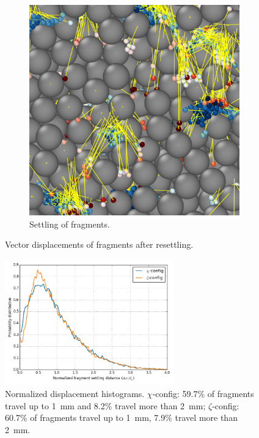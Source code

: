 \documentclass[11pt]{report} %
\begin{document}
\begin{figure}[h]
\begin{subfigure}[t]{0.45\textwidth}
                \includegraphics[width=\textwidth]{images/crushed_final}
                \caption{Settling of fragments.}
                \label{fig:crushed-final}
        \end{subfigure}
        \caption{Vector displacements of fragments after resettling.}\label{fig:crushed-travel}
\end{figure}

\begin{figure}[!t]
    \centering
    \includegraphics[width = 0.65\textwidth]{images/displacement_histograms.png}
    \caption{Normalized displacement histograms. $\chi$-config: 59.7\% of fragments travel up to \SI{1}{\milli\meter} and 8.2\% travel more than \SI{2}{\milli\meter}; $\zeta$-config: 60.7\% of fragments travel up to \SI{1}{\milli\meter}, 7.9\% travel more than \SI{2}{\milli\meter}.}\label{fig:displacement_hists}
\end{figure}
\end{document}
